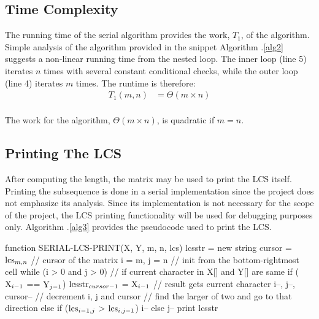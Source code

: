 \documentclass[usletter, 11pt]{extarticle}
\newcommand{\V}[1]{\textup{#1}}
\newcommand{\lcs}{\V{lcs}}
\newcommand{\seqone}{\V{X}}
\newcommand{\seqtwo}{\V{Y}}
\newcommand{\lcsstr}{\V{lcsstr}}
\begin{document}
        \subsection{Time Complexity} The running time of the serial algorithm
        provides the work, $T_{1}$, of the algorithm. Simple analysis of the
        algorithm provided in the snippet Algorithm \thesection .\ref{alg2}
        suggests a non-linear running time from the nested loop. The inner
        loop (line 5) iterates $n$ times with several constant conditional
        checks, while the outer loop (line 4) iterates $m$ times. The runtime
        is therefore:
        \begin{equation*}
            \begin{split}
                T_1(m, n) & = \Theta(m \times n) \\
            \end{split}
        \end{equation*}

        The work for the algorithm, $\Theta(m \times n)$, is quadratic if $m =
        n$.

        \subsection{Printing The LCS} After computing the length, the matrix
        may be used to print the LCS itself. Printing the subsequence is done
        in a serial implementation since the project does not emphasize its
        analysis. Since its implementation is not necessary for the scope of
        the project, the LCS printing functionality will be used for debugging
        purposes only. Algorithm \thesection .\ref{alg3} provides the
        pseudocode used to print the LCS.

\begin{pseudocode}[caption={Serial Longest Common Subsequence Printing},
label={alg3}]
function SERIAL-LCS-PRINT(X, Y, m, n, lcs)
    lcsstr = new string
    cursor = $\lcs_{m,n}$ // cursor of the matrix
    i = m, j = n // init from the bottom-rightmost cell
    while (i > 0 and j > 0)
        // if current character in X[] and Y[] are same
        if ($\seqone_{i - 1}$ == $\seqtwo_{j - 1}$)
            $\lcsstr_{cursor - 1}$ = $\seqone_{i - 1}$  // result gets current character
            i--, j--, cursor-- // decrement i, j and cursor
        // find the larger of two and go to that direction
        else if ($\lcs_{i - 1, j}$ > $\lcs_{i,j - 1}$)
            i--
        else
            j--
    print lcsstr

\end{pseudocode}
\end{document}
